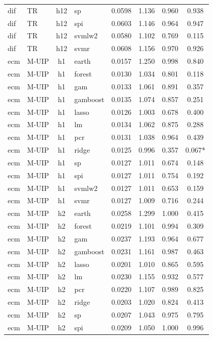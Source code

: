 \begin{ThreePartTable}
\begin{longtable}[t]{llclcccc}
dif & TR & h12 & sp & 0.0598 & 1.136 & 0.960 & 0.938\\
dif & TR & h12 & spi & 0.0603 & 1.146 & 0.964 & 0.947\\
dif & TR & h12 & svmlw2 & 0.0580 & 1.102 & 0.769 & 0.115\\
dif & TR & h12 & svmr & 0.0608 & 1.156 & 0.970 & 0.926\\
\addlinespace
ecm & M-UIP & h1 & earth & 0.0157 & 1.250 & 0.998 & 0.840\\
ecm & M-UIP & h1 & forest & 0.0130 & 1.034 & 0.801 & 0.118\\
ecm & M-UIP & h1 & gam & 0.0133 & 1.061 & 0.891 & 0.357\\
ecm & M-UIP & h1 & gamboost & 0.0135 & 1.074 & 0.857 & 0.251\\
ecm & M-UIP & h1 & lasso & 0.0126 & 1.003 & 0.678 & 0.400\\
ecm & M-UIP & h1 & lm & 0.0134 & 1.062 & 0.875 & 0.288\\
ecm & M-UIP & h1 & pcr & 0.0131 & 1.038 & 0.964 & 0.439\\
ecm & M-UIP & h1 & ridge & 0.0125 & 0.996 & 0.357 & 0.067*\\
ecm & M-UIP & h1 & sp & 0.0127 & 1.011 & 0.674 & 0.148\\
ecm & M-UIP & h1 & spi & 0.0127 & 1.011 & 0.754 & 0.192\\
ecm & M-UIP & h1 & svmlw2 & 0.0127 & 1.011 & 0.653 & 0.159\\
ecm & M-UIP & h1 & svmr & 0.0127 & 1.009 & 0.716 & 0.244\\
\addlinespace
ecm & M-UIP & h2 & earth & 0.0258 & 1.299 & 1.000 & 0.415\\
ecm & M-UIP & h2 & forest & 0.0219 & 1.101 & 0.994 & 0.309\\
ecm & M-UIP & h2 & gam & 0.0237 & 1.193 & 0.964 & 0.677\\
ecm & M-UIP & h2 & gamboost & 0.0231 & 1.161 & 0.987 & 0.463\\
ecm & M-UIP & h2 & lasso & 0.0201 & 1.010 & 0.865 & 0.595\\
ecm & M-UIP & h2 & lm & 0.0230 & 1.155 & 0.932 & 0.577\\
ecm & M-UIP & h2 & pcr & 0.0220 & 1.107 & 0.989 & 0.825\\
ecm & M-UIP & h2 & ridge & 0.0203 & 1.020 & 0.824 & 0.413\\
ecm & M-UIP & h2 & sp & 0.0207 & 1.043 & 0.975 & 0.795\\
ecm & M-UIP & h2 & spi & 0.0209 & 1.050 & 1.000 & 0.996\\

\end{longtable}
\end{ThreePartTable}
